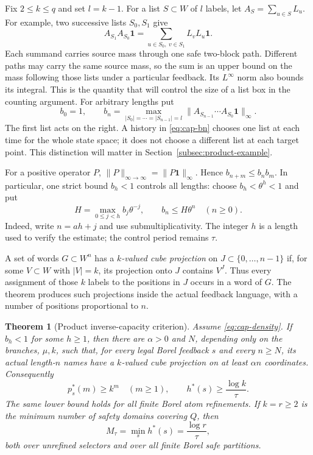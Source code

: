 \documentclass[11pt,reqno]{amsart}
\numberwithin{equation}{section}
\newtheorem{theorem}{Theorem}[section]
\theoremstyle{definition}
\theoremstyle{definition}
\newcommand{\one}{\mathbf 1}
\begin{document}
Fix $2\le k\le q$ and set $l=k-1$. For a list $S\subset W$
of $l$ labels, let $A_S=\sum_{u\in S}L_u$. For example, two
successive lists $S_0,S_1$ give
\[
 A_{S_1}A_{S_0}\one
   =\sum_{u\in S_0,\ v\in S_1}L_vL_u\one.
\]
Each summand carries source mass through one safe two-block path.
Different paths may carry the same source mass, so the sum is an
upper bound on the mass following those lists under a particular
feedback. Its $L^\infty$ norm also bounds its integral. This is the
quantity that will control the size of a list box in the counting
argument. For arbitrary lengths put
\begin{equation}\label{eq:cap-bn}
 b_0=1,\qquad
 b_n=\max_{|S_0|=\cdots=|S_{n-1}|=l}
       \|A_{S_{n-1}}\cdots A_{S_0}\one\|_\infty.
\end{equation}
The first list acts on the right. A history in \eqref{eq:cap-bn}
chooses one list at each time for the whole state space; it does not
choose a different list at each target point. This distinction will
matter in Section~\ref{subsec:product-example}.

For a positive operator $P$, $\|P\|_{\infty\to\infty}
=\|P\one\|_\infty$. Hence $b_{n+m}\le b_nb_m$. In particular,
one strict bound $b_h<1$ controls all lengths: choose
$b_h<\theta^h<1$ and put
\begin{equation}\label{eq:cap-exp}
 H=\max_{0\le j<h}b_j\theta^{-j},\qquad
 b_n\le H\theta^n\quad(n\ge0).
\end{equation}
Indeed, write $n=ah+j$ and use submultiplicativity. The integer
$h$ is a length used to verify the estimate; the control period
remains $\tau$.

A set of words $G\subset W^n$ has a \emph{$k$-valued cube projection}
on $J\subset\{0,\ldots,n-1\}$ if, for some $V\subset W$ with
$|V|=k$, its projection onto $J$ contains $V^J$. Thus every assignment
of those $k$ labels to the positions in $J$ occurs in a word of $G$.
The theorem produces such projections inside the actual feedback
language, with a number of positions proportional to $n$.


\begin{theorem}[Product inverse-capacity criterion]\label{thm:capacity-main}
Assume \eqref{eq:cap-density}. If $b_h<1$ for some $h\ge1$, then
there are $\alpha>0$ and $N$, depending only on the branches,
$\mu,k$, such that, for every legal Borel feedback $s$ and every
$n\ge N$, its actual length-$n$ names have a $k$-valued cube
projection on at least $\alpha n$ coordinates. Consequently
\begin{equation}\label{eq:cap-pattern}
 p_s^*(m)\ge k^m\quad(m\ge1),\qquad
 h^*(s)\ge\frac{\log k}{\tau}.
\end{equation}
The same lower bound holds for all finite Borel atom refinements.
If $k=r\ge2$ is the minimum number of safety domains covering $Q$,
then
\begin{equation}\label{eq:cap-M}
 M_\tau=\min_s h^*(s)=\frac{\log r}{\tau},
\end{equation}
both over unrefined selectors and over all finite Borel safe partitions.
\end{theorem}
\end{document}
